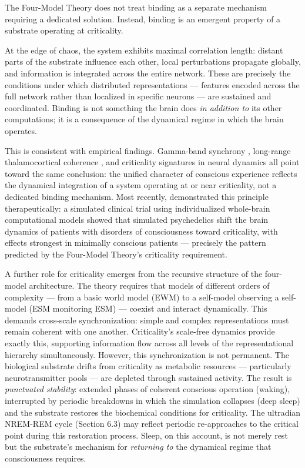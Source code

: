 \documentclass[12pt]{article}
\begin{document}
The Four-Model Theory does not treat binding as a separate mechanism requiring a dedicated solution. Instead, binding is an emergent property of a substrate operating at criticality.

At the edge of chaos, the system exhibits maximal correlation length: distant parts of the substrate influence each other, local perturbations propagate globally, and information is integrated across the entire network. These are precisely the conditions under which distributed representations --- features encoded across the full network rather than localized in specific neurons --- are sustained and coordinated. Binding is not something the brain does \emph{in addition to} its other computations; it is a consequence of the dynamical regime in which the brain operates.

This is consistent with empirical findings. Gamma-band synchrony \citep{Gray1989,Rodriguez1999,Fries2005,Fries2015}, long-range thalamocortical coherence \citep{Llinas1993,Llinas1998}, and criticality signatures in neural dynamics \citep{Beggs2003,Tagliazucchi2012,TuckerLuuFriston2025} all point toward the same conclusion: the unified character of conscious experience reflects the dynamical integration of a system operating at or near criticality, not a dedicated binding mechanism. Most recently, \citet{Alnagger2026} demonstrated this principle therapeutically: a simulated clinical trial using individualized whole-brain computational models showed that simulated psychedelics shift the brain dynamics of patients with disorders of consciousness toward criticality, with effects strongest in minimally conscious patients --- precisely the pattern predicted by the Four-Model Theory's criticality requirement.

A further role for criticality emerges from the recursive structure of the four-model architecture. The theory requires that models of different orders of complexity --- from a basic world model (EWM) to a self-model observing a self-model (ESM monitoring ESM) --- coexist and interact dynamically. This demands cross-scale synchronization: simple and complex representations must remain coherent with one another. Criticality's scale-free dynamics provide exactly this, supporting information flow across all levels of the representational hierarchy simultaneously. However, this synchronization is not permanent. The biological substrate drifts from criticality as metabolic resources --- particularly neurotransmitter pools --- are depleted through sustained activity. The result is \emph{punctuated stability}: extended phases of coherent conscious operation (waking), interrupted by periodic breakdowns in which the simulation collapses (deep sleep) and the substrate restores the biochemical conditions for criticality. The ultradian NREM-REM cycle (Section 6.3) may reflect periodic re-approaches to the critical point during this restoration process. Sleep, on this account, is not merely rest but the substrate's mechanism for \emph{returning to} the dynamical regime that consciousness requires.
\end{document}
